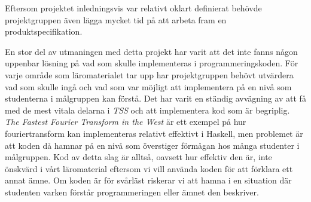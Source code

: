 \documentclass[]{article}
\begin{document}
Eftersom projektet inledningsvis var relativt oklart definierat behövde projektgruppen även lägga mycket tid på att
arbeta fram en produktspecifikation.


En stor del av utmaningen med detta projekt har varit att det inte fanns någon uppenbar lösning på vad som skulle
implementeras i programmeringskoden. För varje område som läromaterialet tar upp har projektgruppen behövt utvärdera
vad som skulle ingå och vad som var möjligt att implementera på en nivå som studenterna i målgruppen kan förstå. Det
har varit en ständig avvägning av att få med de mest vitala delarna i \textit{TSS} och att implementera kod som är
begriplig.  \textit{The Fastest Fourier Transform in the West} %
är ett exempel på hur fouriertransform kan implementeras relativt effektivt i Haskell, men problemet är att koden då
hamnar på en nivå som överstiger förmågan hos många studenter i målgruppen. Kod av detta slag är alltså, oavsett hur
effektiv den är, inte önskvärd i vårt läromaterial eftersom vi vill använda koden för att förklara ett annat ämne. Om
koden är för svårläst riskerar vi att hamna i en situation där studenten varken förstår programmeringen eller ämnet den
beskriver.
\end{document}
